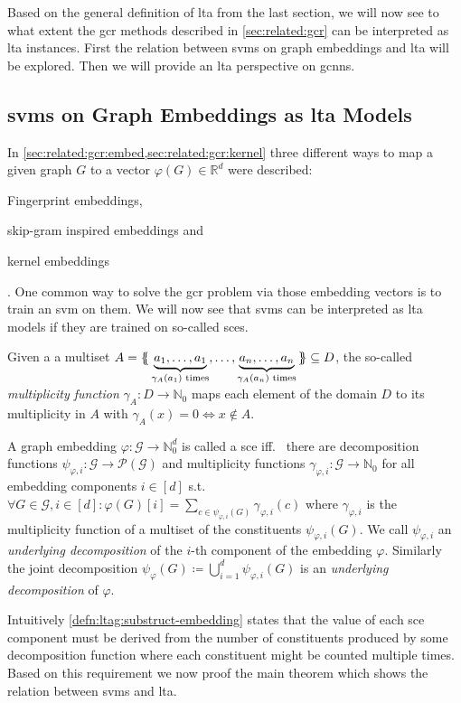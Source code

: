 Based on the general definition of \ac{lta} from the last section, we will now see to what extent the \ac{gcr} methods described in \cref{sec:related:gcr} can be interpreted as \ac{lta} instances.
First the relation between \acp{svm} on graph embeddings and \ac{lta} will be explored.
Then we will provide an \ac{lta} perspective on \acp{gcnn}.

\subsection{\acsp*{svm} on Graph Embeddings as \acs*{lta} Models}%
\label{sec:ltag:formulation:svm}

In \cref{sec:related:gcr:embed,sec:related:gcr:kernel} three different ways to map a given graph $G$ to a vector $\varphi(G) \in \mathbb{R}^d$ were described:
\begin{enumerate*}
	\item Fingerprint embeddings,
	\item skip-gram inspired embeddings and
	\item kernel embeddings
\end{enumerate*}.
One common way to solve the \ac{gcr} problem via those embedding vectors is to train an \ac{svm} on them.
We will now see that \acp{svm} can be interpreted as \ac{lta} models if they are trained on so-called \acp*{sce}.
\begin{defn}
	Given a a multiset $A = \ldblbrace \underbrace{a_1, \dots, a_1}_{\gamma_A(a_1)\text{ times}},\allowbreak \dots, \underbrace{a_n, \dots, a_n}_{\gamma_A(a_n)\text{ times}} \rdblbrace \subseteq D$, the so-called \textit{multiplicity function} $\gamma_A: D \to \mathbb{N}_0$ maps each element of the domain $D$ to its multiplicity in $A$ with $\gamma_A(x) = 0 \Leftrightarrow x \notin A$.
\end{defn}
\begin{defn}\label{defn:ltag:substruct-embedding}
	A graph embedding $\varphi: \mathcal{G} \to \mathbb{N}_0^{d}$ is called a \ac{sce} iff.\ %
	there are decomposition functions $\psi_{\varphi, i}: \mathcal{G} \to \mathcal{P}(\mathcal{G})$ and multiplicity functions $\gamma_{\varphi, i}: \mathcal{G} \to \mathbb{N}_0$ for all embedding components $i \in [d]$ s.t.\ %
	$\forall G \in \mathcal{G}, i \in [d]: \varphi(G)[i] = \sum_{c \in \psi_{\varphi, i}(G)} \gamma_{\varphi, i}(c)$ where $\gamma_{\varphi, i}$ is the multiplicity function of a multiset of the constituents $\psi_{\varphi, i}(G)$.
	We call $\psi_{\varphi, i}$ an \textit{underlying decomposition} of the $i$-th component of the embedding $\varphi$.
	Similarly the joint decomposition $\psi_{\varphi}(G) \coloneqq \bigcup_{i=1}^d \psi_{\varphi,i}(G)$ is an \textit{underlying decomposition} of $\varphi$.
\end{defn}
Intuitively \cref{defn:ltag:substruct-embedding} states that the value of each \ac{sce} component must be derived from the number of constituents produced by some decomposition function where each constituent might be counted multiple times.
Based on this requirement we now proof the main theorem which shows the relation between \acp{svm} and \ac{lta}.

